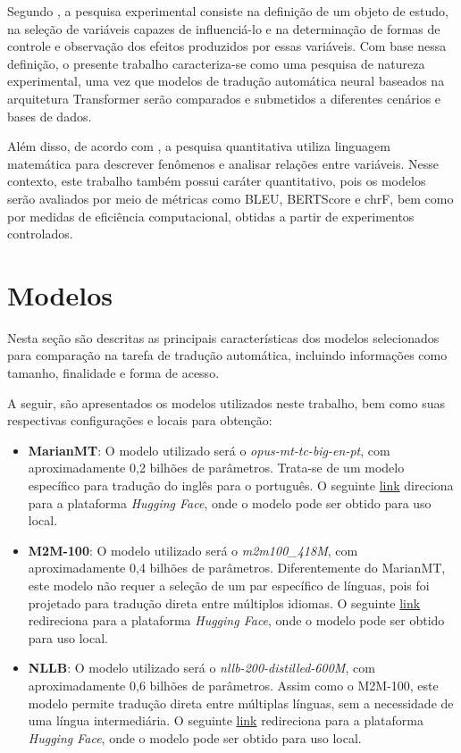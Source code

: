 Segundo , a pesquisa experimental consiste na definição de um objeto de estudo, na seleção de variáveis capazes de influenciá-lo e na determinação de formas de controle e observação dos efeitos produzidos por essas variáveis. Com base nessa definição, o presente trabalho caracteriza-se como uma pesquisa de natureza experimental, uma vez que modelos de tradução automática neural baseados na arquitetura Transformer serão comparados e submetidos a diferentes cenários e bases de dados.

Além disso, de acordo com , a pesquisa quantitativa utiliza linguagem matemática para descrever fenômenos e analisar relações entre variáveis. Nesse contexto, este trabalho também possui caráter quantitativo, pois os modelos serão avaliados por meio de métricas como BLEU, BERTScore e chrF, bem como por medidas de eficiência computacional, obtidas a partir de experimentos controlados.


\section{Modelos}

Nesta seção são descritas as principais características dos modelos selecionados para comparação na tarefa de tradução automática, incluindo informações como tamanho, finalidade e forma de acesso.

A seguir, são apresentados os modelos utilizados neste trabalho, bem como suas respectivas configurações e locais para obtenção:

\begin{itemize}
    \item \textbf{MarianMT}: O modelo utilizado será o \textit{opus-mt-tc-big-en-pt}, com aproximadamente 0,2 bilhões de parâmetros. Trata-se de um modelo específico para tradução do inglês para o português. O seguinte \href{https://huggingface.co/Helsinki-NLP/opus-mt-tc-big-en-pt}{link} direciona para a plataforma \textit{Hugging Face}, onde o modelo pode ser obtido para uso local.

    \item \textbf{M2M-100}: O modelo utilizado será o \textit{m2m100\_418M}, com aproximadamente 0,4 bilhões de parâmetros. Diferentemente do MarianMT, este modelo não requer a seleção de um par específico de línguas, pois foi projetado para tradução direta entre múltiplos idiomas. O seguinte \href{https://huggingface.co/facebook/m2m100_418M}{link} redireciona para a plataforma \textit{Hugging Face}, onde o modelo pode ser obtido para uso local.

    \item \textbf{NLLB}: O modelo utilizado será o \textit{nllb-200-distilled-600M}, com aproximadamente 0,6 bilhões de parâmetros. Assim como o M2M-100, este modelo permite tradução direta entre múltiplas línguas, sem a necessidade de uma língua intermediária. O seguinte \href{https://huggingface.co/facebook/nllb-200-distilled-600M}{link} redireciona para a plataforma \textit{Hugging Face}, onde o modelo pode ser obtido para uso local.

\end{itemize}

